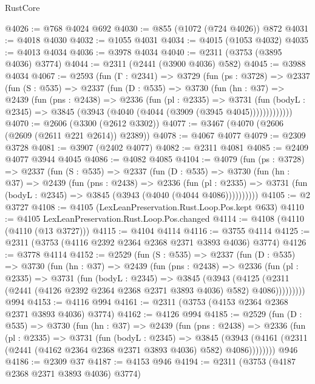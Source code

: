 \begin{lexlean}{RustCore}
\begin{coremodule}
@4026 := @768 @4024 @692
@4030 := @855 (@1072 (@724 @4026)) @872
@4031 := @4018 @4030
@4032 := @1055 @4031
@4034 := @4015 (@1053 @4032)
@4035 := @4013 @4034
@4036 := @3978 @4034
@4040 := @2311 (@3753 (@3895 @4036) @3774)
@4044 := @2311 (@2441 (@3900 @4036) @582)
@4045 := @3988 @4034
@4067 := @2593
    (fun (Γ : @2341) =>
    @3729
      (fun (ps : @3728) =>
      @2337
        (fun (S : @535) =>
        @2337
          (fun (D : @535) =>
          @3730
            (fun (hn : @37) =>
            @2439
              (fun (pns : @2438) =>
              @2336
                (fun (pl : @2335) =>
                @3731
                  (fun (bodyL : @2345) =>
                  @3845 (@3943 (@4040 (@4044 (@3909 (@3945 @4045)))))))))))))
@4070 := @2606 (@3300 (@2612 @3302))
@4077 := @3467 (@4070 (@2606 (@2609 (@2611 @221 @2614)) @2389))
@4078 := @4067 @4077
@4079 := @2309 @3728
@4081 := @3907 (@2402 @4077)
@4082 := @2311 @4081
@4085 := @2409 @4077 @3944 @4045
@4086 := @4082 @4085
@4104 := @4079
    (fun (ps : @3728) =>
    @2337
      (fun (S : @535) =>
      @2337
        (fun (D : @535) =>
        @3730
          (fun (hn : @37) =>
          @2439
            (fun (pns : @2438) =>
            @2336
              (fun (pl : @2335) =>
              @3731 (fun (bodyL : @2345) => @3845 (@3943 (@4040 (@4044 @4086))))))))))
@4105 := @2 @3727
@4108 := @4105 (LexLeanPreservation.Rust.Loop.Pos.kept @633)
@4110 := @4105 LexLeanPreservation.Rust.Loop.Pos.changed
@4114 := @4108 (@4110 (@4110 (@13 @3727)))
@4115 := @4104 @4114
@4116 := @3755 @4114
@4125 := @2311 (@3753 (@4116 @2392 @2364 @2368 @2371 @3893 @4036) @3774)
@4126 := @3778 @4114
@4152 := @2529
    (fun (S : @535) =>
    @2337
      (fun (D : @535) =>
      @3730
        (fun (hn : @37) =>
        @2439
          (fun (pns : @2438) =>
          @2336
            (fun (pl : @2335) =>
            @3731
              (fun (bodyL : @2345) =>
              @3845
                (@3943
                  (@4125
                    (@2311 (@2441 (@4126 @2392 @2364 @2368 @2371 @3893 @4036) @582) @4086)))))))))
    @994
@4153 := @4116 @994
@4161 := @2311 (@3753 (@4153 @2364 @2368 @2371 @3893 @4036) @3774)
@4162 := @4126 @994
@4185 := @2529
    (fun (D : @535) =>
    @3730
      (fun (hn : @37) =>
      @2439
        (fun (pns : @2438) =>
        @2336
          (fun (pl : @2335) =>
          @3731
            (fun (bodyL : @2345) =>
            @3845
              (@3943 (@4161 (@2311 (@2441 (@4162 @2364 @2368 @2371 @3893 @4036) @582) @4086))))))))
    @946
@4186 := @2309 @37
@4187 := @4153 @946
@4194 := @2311 (@3753 (@4187 @2368 @2371 @3893 @4036) @3774)

\end{coremodule}
\end{lexlean}
